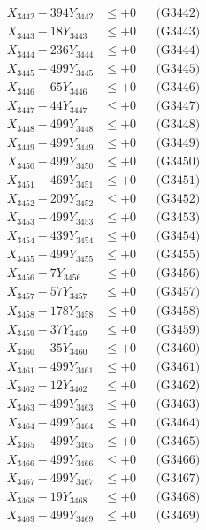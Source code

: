 \documentclass[a4paper,10pt]{article}
\begin{document}
{\begin{align}
X_{3442} - 394Y_{3442} &\leq +0 && \text{(G3442)} \\
X_{3443} - 18Y_{3443} &\leq +0 && \text{(G3443)} \\
X_{3444} - 236Y_{3444} &\leq +0 && \text{(G3444)} \\
X_{3445} - 499Y_{3445} &\leq +0 && \text{(G3445)} \\
X_{3446} - 65Y_{3446} &\leq +0 && \text{(G3446)} \\
X_{3447} - 44Y_{3447} &\leq +0 && \text{(G3447)} \\
X_{3448} - 499Y_{3448} &\leq +0 && \text{(G3448)} \\
X_{3449} - 499Y_{3449} &\leq +0 && \text{(G3449)} \\
X_{3450} - 499Y_{3450} &\leq +0 && \text{(G3450)} \\
\allowbreak
X_{3451} - 469Y_{3451} &\leq +0 && \text{(G3451)} \\
X_{3452} - 209Y_{3452} &\leq +0 && \text{(G3452)} \\
X_{3453} - 499Y_{3453} &\leq +0 && \text{(G3453)} \\
X_{3454} - 439Y_{3454} &\leq +0 && \text{(G3454)} \\
X_{3455} - 499Y_{3455} &\leq +0 && \text{(G3455)} \\
X_{3456} - 7Y_{3456} &\leq +0 && \text{(G3456)} \\
X_{3457} - 57Y_{3457} &\leq +0 && \text{(G3457)} \\
X_{3458} - 178Y_{3458} &\leq +0 && \text{(G3458)} \\
X_{3459} - 37Y_{3459} &\leq +0 && \text{(G3459)} \\
X_{3460} - 35Y_{3460} &\leq +0 && \text{(G3460)} \\
\allowbreak
X_{3461} - 499Y_{3461} &\leq +0 && \text{(G3461)} \\
X_{3462} - 12Y_{3462} &\leq +0 && \text{(G3462)} \\
X_{3463} - 499Y_{3463} &\leq +0 && \text{(G3463)} \\
X_{3464} - 499Y_{3464} &\leq +0 && \text{(G3464)} \\
X_{3465} - 499Y_{3465} &\leq +0 && \text{(G3465)} \\
X_{3466} - 499Y_{3466} &\leq +0 && \text{(G3466)} \\
X_{3467} - 499Y_{3467} &\leq +0 && \text{(G3467)} \\
X_{3468} - 19Y_{3468} &\leq +0 && \text{(G3468)} \\
X_{3469} - 499Y_{3469} &\leq +0 && \text{(G3469)} \\

\end{align}}
\end{document}

